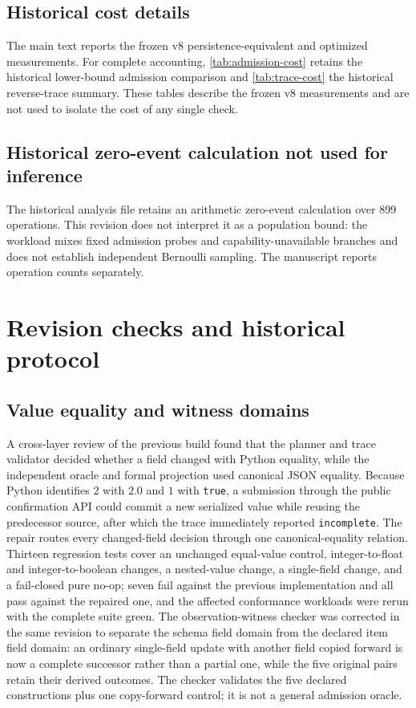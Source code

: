 \documentclass[preprint,12pt,authoryear]{elsarticle}
\newcommand{\code}[1]{\nolinkurl{#1}}
\begin{document}
\subsection{Historical cost details}
\label{app:historical-cost}

The main text reports the frozen v8 persistence-equivalent and optimized measurements. For complete accounting, \cref{tab:admission-cost} retains the historical lower-bound admission comparison and \cref{tab:trace-cost} the historical reverse-trace summary. These tables describe the frozen v8 measurements and are not used to isolate the cost of any single check.





\subsection{Historical zero-event calculation not used for inference}
\label{app:zero-event}
The historical analysis file retains an arithmetic zero-event calculation over 899 operations. This revision does not interpret it as a population bound: the workload mixes fixed admission probes and capability-unavailable branches and does not establish independent Bernoulli sampling. The manuscript reports operation counts separately.

\section{Revision checks and historical protocol}
\subsection{Value equality and witness domains}

A cross-layer review of the previous build found that the planner and trace validator decided whether a field changed with Python equality, while the independent oracle and formal projection used canonical JSON equality. Because Python identifies $2$ with $2.0$ and $1$ with \code{true}, a submission through the public confirmation API could commit a new serialized value while reusing the predecessor source, after which the trace immediately reported \code{incomplete}. The repair routes every changed-field decision through one canonical-equality relation. Thirteen regression tests cover an unchanged equal-value control, integer-to-float and integer-to-boolean changes, a nested-value change, a single-field change, and a fail-closed pure no-op; seven fail against the previous implementation and all pass against the repaired one, and the affected conformance workloads were rerun with the complete suite green. The observation-witness checker was corrected in the same revision to separate the schema field domain from the declared item field domain: an ordinary single-field update with another field copied forward is now a complete successor rather than a partial one, while the five original pairs retain their derived outcomes. The checker validates the five declared constructions plus one copy-forward control; it is not a general admission oracle.
\end{document}
